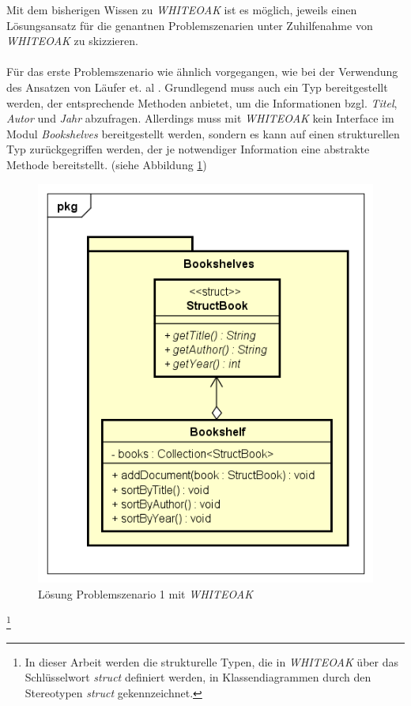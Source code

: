 \documentclass[11pt, 
ngerman,
doublespacing,
chapterinoneline, %
consistentlayout, %
]{scrartcl}
\begin{document}
Mit dem bisherigen Wissen zu \emph{WHITEOAK} ist es möglich, jeweils einen Lösungsansatz für die genantnen Problemszenarien unter Zuhilfenahme von \emph{WHITEOAK} zu skizzieren.\\\\
Für das erste Problemszenario wie ähnlich vorgegangen, wie bei der Verwendung des Ansatzen von Läufer et. al \cite{structconfjava}. Grundlegend muss auch ein Typ bereitgestellt werden, der entsprechende Methoden anbietet, um die Informationen bzgl. \emph{Titel}, \emph{Autor} und \emph{Jahr} abzufragen. 
Allerdings muss mit \emph{WHITEOAK} kein Interface im Modul \emph{Bookshelves} bereitgestellt werden, sondern es kann auf einen strukturellen Typ zurückgegriffen werden, der je notwendiger Information eine abstrakte Methode bereitstellt. (siehe Abbildung \ref{cd_loesungProblem1_whiteoak})
\begin{figure}[h]
\centering
\includegraphics[scale=0.5]{pics/cd_loesungProlem1_whiteoak.png}
\caption{Lösung Problemszenario 1 mit \emph{WHITEOAK}\protect\footnotemark  }
\label{cd_loesungProblem1_whiteoak}
\end{figure}
\footnote{In dieser Arbeit werden die strukturelle Typen, die in \emph{WHITEOAK} über das Schlüsselwort \emph{struct} definiert werden, in Klassendiagrammen durch den Stereotypen \emph{struct} gekennzeichnet.}
\end{document}
